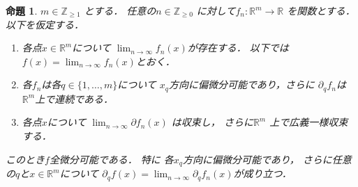 \documentclass[leqno, a4paper, 12pt]{jsarticle}
\newtheorem{prop}[thm]{命題}
\newcommand{\zz}{\mathbb{Z}}
\newcommand{\rr}{\mathbb{R}}
\begin{document}
\begin{prop}\label{prop:limit}
$m\in \zz_{\ge 1}$
とする．
任意の$n\in \zz_{\ge 0}$
に対して$f_{n}\colon \rr^{m}\to \rr$
を関数とする．
以下を仮定する．
\begin{enumerate}
\item
各点$x\in \rr^{m}$について
$\lim_{n\to \infty}f_{n}(x)$が存在する．
以下では$f(x)=\lim_{n\to \infty}f_{n}(x)$とおく．
\item 
各$f_{n}$は各$q\in \{1, \dots, m\}$について
$x_{q}$方向に偏微分可能であり，さらに
$\partial_{q}f_{n}$は$\rr^{m}$上で連続である．
\item 
各点$x$について
$\lim_{n\to \infty}\partial f_{n}(x)$
は収束し，
さらに$\rr^{m}$
上で広義一様収束する．

\end{enumerate}
このとき$f$全微分可能である．
特に
各$x_{q}$方向に偏微分可能であり，
さらに任意の$q$と$x\in \rr^{m}$について
$\partial_{q}f(x)=
\lim_{n\to \infty}\partial_{q}f_{n}(x)$が成り立つ．
\end{prop}
\end{document}
